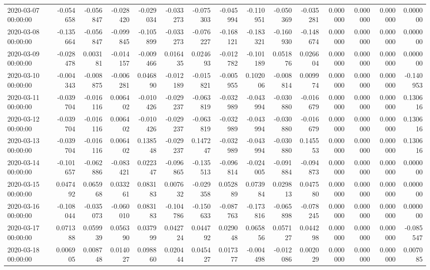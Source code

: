 \begin{tabular}{lrrrrrrrrrrrrrr}
2020-03-07 00:00:00 & -0.054658 & -0.056847 & -0.028420 & -0.029034 & -0.033273 & -0.075303 & -0.045994 & -0.110951 & -0.050369 & -0.035281 & 0.000000 & 0.000000 & 0.000000 & 0.000000 \\
2020-03-08 00:00:00 & -0.135664 & -0.056847 & -0.099845 & -0.105899 & -0.033273 & -0.076227 & -0.168121 & -0.183321 & -0.160930 & -0.148674 & 0.000000 & 0.000000 & 0.000000 & 0.000000 \\
2020-03-09 00:00:00 & -0.028478 & 0.003181 & -0.014157 & -0.009466 & 0.016435 & 0.024693 & -0.012782 & -0.101189 & 0.051876 & 0.026604 & 0.000000 & 0.000000 & 0.000000 & 0.000000 \\
2020-03-10 00:00:00 & -0.004343 & -0.008875 & -0.006281 & 0.046890 & -0.012189 & -0.015821 & -0.005955 & 0.102006 & -0.008814 & 0.009974 & 0.000000 & 0.000000 & 0.000000 & -0.140953 \\
2020-03-11 00:00:00 & -0.039704 & -0.016116 & 0.006402 & -0.010426 & -0.029237 & -0.063819 & -0.032989 & -0.043994 & -0.030880 & -0.016679 & 0.000000 & 0.000000 & 0.000000 & 0.130616 \\
2020-03-12 00:00:00 & -0.039704 & -0.016116 & 0.006402 & -0.010426 & -0.029237 & -0.063819 & -0.032989 & -0.043994 & -0.030880 & -0.016679 & 0.000000 & 0.000000 & 0.000000 & 0.130616 \\
2020-03-13 00:00:00 & -0.039704 & -0.016116 & 0.006402 & 0.138548 & -0.029237 & 0.147247 & -0.032989 & -0.043994 & -0.030880 & 0.145553 & 0.000000 & 0.000000 & 0.000000 & 0.130616 \\
2020-03-14 00:00:00 & -0.101657 & -0.062886 & -0.083421 & 0.022347 & -0.096865 & -0.135513 & -0.096814 & -0.024005 & -0.091884 & -0.094873 & 0.000000 & 0.000000 & 0.000000 & 0.000000 \\
2020-03-15 00:00:00 & 0.047492 & 0.065968 & 0.033261 & 0.083183 & 0.007632 & -0.029358 & 0.052889 & 0.073984 & 0.029813 & 0.047580 & 0.000000 & 0.000000 & 0.000000 & 0.000000 \\
2020-03-16 00:00:00 & -0.108044 & -0.035073 & -0.060010 & 0.083183 & -0.104786 & -0.150633 & -0.087763 & -0.173816 & -0.065898 & -0.078245 & 0.000000 & 0.000000 & 0.000000 & 0.000000 \\
2020-03-17 00:00:00 & 0.071388 & 0.059939 & 0.056390 & 0.037999 & 0.042724 & 0.044792 & 0.029048 & 0.065856 & 0.057127 & 0.044298 & 0.000000 & 0.000000 & 0.000000 & -0.085547 \\
2020-03-18 00:00:00 & 0.006905 & 0.008748 & 0.014027 & 0.098860 & 0.020444 & 0.045427 & 0.017377 & -0.004498 & -0.012086 & 0.002029 & 0.000000 & 0.000000 & 0.000000 & 0.007085 \\

\end{tabular}
